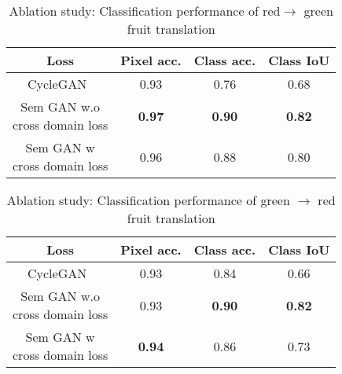 \begin{table}[!htpb]
    \begin{center}
        \begin{tabular}{c c c c}
            \textbf{Loss} & \textbf{Pixel acc.} & \textbf{Class acc.} & \textbf{Class IoU} \\
            \hline
            CycleGAN~\cite{zhu_unpaired_2017} & 0.93 & 0.76 & 0.68 \\
            \specialcell{Sem GAN w.o \\ cross domain loss} & \textbf{0.97} & \textbf{0.90} & \textbf{0.82} \\
            \specialcell{Sem GAN w \\ cross domain loss} & 0.96 & 0.88 & 0.80
        \end{tabular}
    \end{center}
    \caption{Ablation study: Classification performance of red$\to$ green fruit translation}
    \label{tab:green2red_ablation}
\end{table}

\begin{table}[!htpb]
    \begin{center}
        \begin{tabular}{c c c c}
            \textbf{Loss} & \textbf{Pixel acc.} & \textbf{Class acc.} & \textbf{Class IoU} \\
            \hline
            CycleGAN~\cite{zhu_unpaired_2017} & 0.93 & 0.84 & 0.66\\
            \specialcell{Sem GAN w.o \\ cross domain loss} & 0.93 & \textbf{0.90} & \textbf{0.82} \\
            \specialcell{Sem GAN w \\ cross domain loss} & \textbf{0.94} & 0.86 & 0.73
        \end{tabular}
    \end{center}
    \caption{Ablation study: Classification performance of green $\to$ red fruit translation}
    \label{tab:red2green_ablation}
\end{table}

